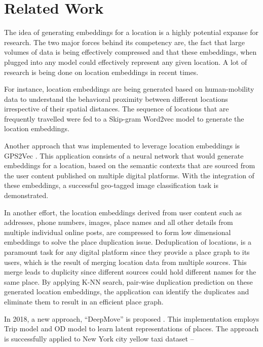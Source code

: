 \documentclass{article}
\begin{document}
\section{Related Work}
\par The idea of generating embeddings for a location is a highly potential expanse for
research. The two major forces behind its competency are, the fact that large volumes of
data is being effectively compressed and that these embeddings, when plugged into any
model could effectively represent any given location.  A lot of research is being done 
on location embeddings in recent times. 
\par For instance, location embeddings are being 
generated based on human-mobility data \parencite{GeoEmbeddings} to understand the 
behavioral proximity between different locations irrespective of their spatial distances.
The sequence of locations that are frequently travelled were fed to a Skip-gram Word2vec 
model to generate the location embeddings. 
\par Another approach that was implemented to 
leverage location embeddings is GPS2Vec  \parencite{GPS2Vec}.  This application consists
of a neural network that would generate embeddings for a location, based on the semantic 
contexts that are sourced from the user content published on multiple digital platforms.
With the integration of these embeddings, a successful geo-tagged image classification 
task is demonstrated. 
\par In another effort\parencite{PlaceDeduplication}, the location embeddings derived from user content such as addresses, phone numbers, images, place
names and all other details from multiple individual online posts, are compressed to 
form low dimensional embeddings to solve the place duplication issue. Deduplication of 
locations, is a paramount task for any digital platform since they provide a place graph
to its users, which is the result of merging location data from multiple sources. This 
merge leads to duplicity since different sources could hold different names for the same 
place. By applying K-NN search, pair-wise duplication prediction on these generated 
location embeddings, the application can identify the duplicates and eliminate them to 
result in an efficient place graph.
\par In 2018, a new approach, “DeepMove” is proposed \parencite{DeepMove}. This 
implementation employs Trip model and OD model to learn latent representations of 
places.  The approach is successfully applied to New York city yellow taxi dataset – 
\end{document}

